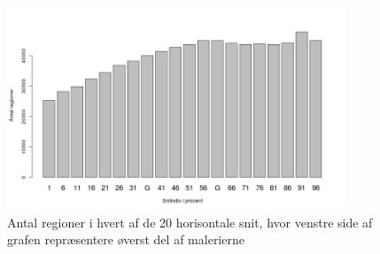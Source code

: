 \begin{figure}[h!]
	\begin{center}
		\includegraphics[width=0.9\textwidth]{afsnit/resultater/billeder/cut2cut3eatsperratio.png}
	\end{center}
	\caption{Antal regioner i hvert af de 20 horisontale snit, hvor venstre side af grafen repræsentere øverst del af malerierne}
	\label{antal_regioner_horisontale_cut}
\end{figure}
